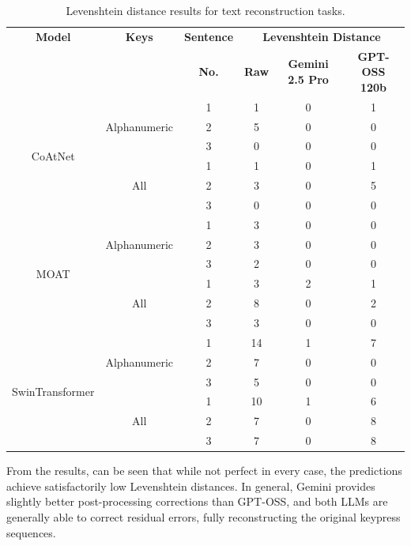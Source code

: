 \documentclass[a4paper,11pt,twoside]{report}
\theoremstyle{definition}
\begin{document}
\begin{table}[h!]
\centering
\caption{Levenshtein distance results for text reconstruction tasks.}
\begin{adjustbox}{max width=\textwidth}
\begin{tabular}{c|c|c|c|c|c}
\hline
\textbf{Model} & \textbf{Keys} & \textbf{Sentence}  &  \multicolumn{3}{c}{\textbf{Levenshtein Distance}} \\
\cline{4-6}
       & & \textbf{No.}& \textbf{Raw}  &   \textbf{Gemini 2.5 Pro}   &  \textbf{GPT-OSS 120b} \\
\hline
\multirow{6}{*}{CoAtNet} & \multirow{3}{*}{Alphanumeric} & 1 & 1 & 0 & 1 \\
& & 2 & 5 & 0 & 0 \\
& & 3 & 0 & 0 & 0 \\
\cline{2-6}
& \multirow{3}{*}{All} & 1 & 1 & 0 & 1\\
& & 2 & 3 & 0 & 5\\
& & 3 & 0 & 0 & 0\\
\hline

\multirow{6}{*}{MOAT} & \multirow{3}{*}{Alphanumeric} & 1 & 3 & 0 & 0 \\
& & 2 & 3 & 0 & 0 \\
& & 3 & 2 & 0 & 0 \\
\cline{2-6}
& \multirow{3}{*}{All} & 1 & 3 & 2 & 1\\
& & 2 & 8 & 0 & 2 \\
& & 3 & 3 & 0 & 0 \\
\hline

\multirow{6}{*}{SwinTransformer} & \multirow{3}{*}{Alphanumeric} & 1 & 14 & 1 & 7 \\
& & 2 & 7 & 0 & 0 \\
& & 3 & 5 & 0 & 0 \\
\cline{2-6}
& \multirow{3}{*}{All} & 1 & 10 & 1 & 6 \\
& & 2 & 7 & 0 & 8 \\
& & 3 & 7 & 0 & 8\\
\hline
\end{tabular}
\end{adjustbox}
\label{tab:levenshtein_results}
\end{table}

\vspace{1em}

From the results, can be seen that while not perfect in every case, the predictions achieve satisfactorily low Levenshtein distances. In general, Gemini provides slightly better post-processing corrections than GPT-OSS, and both LLMs are generally able to correct residual errors, fully reconstructing the original keypress sequences.
\end{document}

